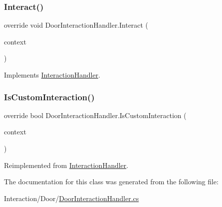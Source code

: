 \mbox{\label{class_door_interaction_handler_ab4099b8368bb7d8cb8e0d8ed0795e9b9}} 
\subsubsection{\texorpdfstring{Interact()}{Interact()}}
{\footnotesize\ttfamily override void Door\+Interaction\+Handler.\+Interact (\begin{DoxyParamCaption}\item[{\mbox{\hyperlink{class_interaction_context}{Interaction\+Context}}}]{context }\end{DoxyParamCaption})\hspace{0.3cm}{\ttfamily [virtual]}}



Implements \mbox{\hyperlink{class_interaction_handler_ae240fb919621a4e6d5e3dc6130c809d0}{Interaction\+Handler}}.

\mbox{\label{class_door_interaction_handler_a2621737500ee61f39f1873cf2353831c}} 
\subsubsection{\texorpdfstring{Is\+Custom\+Interaction()}{IsCustomInteraction()}}
{\footnotesize\ttfamily override bool Door\+Interaction\+Handler.\+Is\+Custom\+Interaction (\begin{DoxyParamCaption}\item[{\mbox{\hyperlink{class_interaction_context}{Interaction\+Context}}}]{context }\end{DoxyParamCaption})\hspace{0.3cm}{\ttfamily [virtual]}}



Reimplemented from \mbox{\hyperlink{class_interaction_handler_aa6e40ea3f53f5f2a900fd25cf84c8b7f}{Interaction\+Handler}}.



The documentation for this class was generated from the following file\+:\begin{DoxyCompactItemize}
\item 
Interaction/\+Door/\mbox{\hyperlink{_door_interaction_handler_8cs}{Door\+Interaction\+Handler.\+cs}}\end{DoxyCompactItemize}
